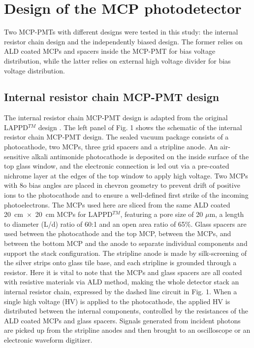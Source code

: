 \documentclass[preprint,5p]{elsarticle}
\begin{document}
\section{Design of the MCP photodetector} \label{sec_design}
Two MCP-PMTs with different designs were tested in this study: the internal 
resistor chain design and the independently biased design. The former relies on 
ALD coated MCPs and spacers inside the MCP-PMT for bias voltage distribution, 
while the latter relies on external high voltage divider for bias voltage 
distribution.  

\subsection{Internal resistor chain MCP-PMT design} \label{}
The internal resistor chain MCP-PMT design is adapted from the original LAPPD$^{TM}$ 
design \cite{17}. The left panel of Fig. 1 shows the schematic of the internal 
resistor chain MCP-PMT design. The sealed vacuum package consists of a 
photocathode, two MCPs, three grid spacers and a stripline anode. An air-sensitive 
alkali antimonide photocathode is deposited on the inside surface of the top 
glass window, and the electronic connection is led out via a pre-coated 
nichrome layer at the edges of the top window to apply high voltage. Two MCPs 
with 8o bias angles are placed in chevron geometry to prevent drift of positive 
ions to the photocathode and to ensure a well-defined first strike of the 
incoming photoelectrons. The MCPs used here are sliced from the same ALD coated 
20~cm~$\times$~20~cm MCPs for LAPPD$^{TM}$, featuring a pore size of 20 $\mu$m, 
a length to diameter (L/d) ratio of 60:1 and an open area ratio of 65\%.  Glass 
spacers are used between the photocathode and the top MCP, between the MCPs, 
and between the bottom MCP and the anode to separate individual components and 
support the stack configuration. The stripline anode is made by silk-screening 
of the silver strips onto glass tile base, and each stripline is grounded 
through a resistor. Here it is vital to note that the MCPs and glass spacers 
are all coated with resistive materials via ALD method, making the whole 
detector stack an internal resistor chain, expressed by the dashed line circuit in 
Fig. 1. When a single high voltage (HV) is applied to the photocathode, the 
applied HV is distributed between the internal components, controlled by the 
resistances of the ALD coated MCPs and glass spacers. Signals generated from 
incident photons are picked up from the stripline anodes and then brought to 
an oscilloscope or an electronic waveform digitizer. 
\end{document}
